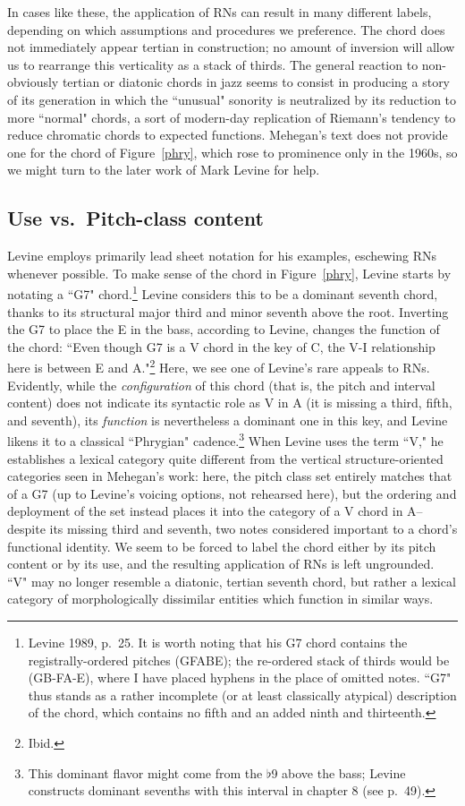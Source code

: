 In cases like these, the application of RNs can result in many different labels, depending on which assumptions and procedures we preference.  The chord does not immediately appear tertian in construction; no amount of inversion will allow us to rearrange this verticality as a stack of thirds.  The general reaction to non-obviously tertian or diatonic chords in jazz seems to consist in producing a story of its generation in which the ``unusual" sonority is neutralized by its reduction to more ``normal" chords, a sort of modern-day replication of Riemann's tendency to reduce chromatic chords to expected functions.  Mehegan's text does not provide one for the chord of Figure~\ref{phry}, which rose to prominence only in the 1960s, so we might turn to the later work of Mark Levine for help.

\subsection{Use vs.\ Pitch-class content}
Levine employs primarily lead sheet notation for his examples, eschewing RNs whenever possible.  To make sense of the chord in Figure~\ref{phry}, Levine starts by notating a ``G7" chord.\footnote{Levine 1989, p.\ 25.  It is worth noting that his G7 chord contains the registrally-ordered pitches (GFABE); the re-ordered stack of thirds would be (GB-FA-E), where I have placed hyphens in the place of omitted notes.  ``G7" thus stands as a rather incomplete (or at least classically atypical) description of the chord, which contains no fifth and an added ninth and thirteenth.}  Levine considers this to be a dominant seventh chord, thanks to its structural major third and minor seventh above the root.  Inverting the G7 to place the E in the bass, according to Levine, changes the function of the chord: ``Even though G7 is a V chord in the key of C, the V-I relationship here is between E and A."\footnote{Ibid.}  Here, we see one of Levine's rare appeals to RNs.  Evidently, while the \emph{configuration} of this chord (that is, the pitch and interval content) does not indicate its syntactic role as V in A (it is missing a third, fifth, and seventh), its \emph{function} is nevertheless a dominant one in this key, and Levine likens it to a classical ``Phrygian" cadence.\footnote{This dominant flavor might come from the $\flat$9 above the bass; Levine constructs dominant sevenths with this interval in chapter 8 (see p.\ 49).}  When Levine uses the term ``V," he establishes a lexical category quite different from the vertical structure-oriented categories seen in Mehegan's work: here, the pitch class set entirely matches that of a G7 (up to Levine's voicing options, not rehearsed here), but the ordering and deployment of the set instead places it into the category of a V chord in A-- despite its missing third and seventh, two notes considered important to a chord's functional identity.  We seem to be forced to label the chord either by its pitch content or by its use, and the resulting application of RNs is left ungrounded.  ``V" may no longer resemble a diatonic, tertian seventh chord, but rather a lexical category of morphologically dissimilar entities which function in similar ways.

